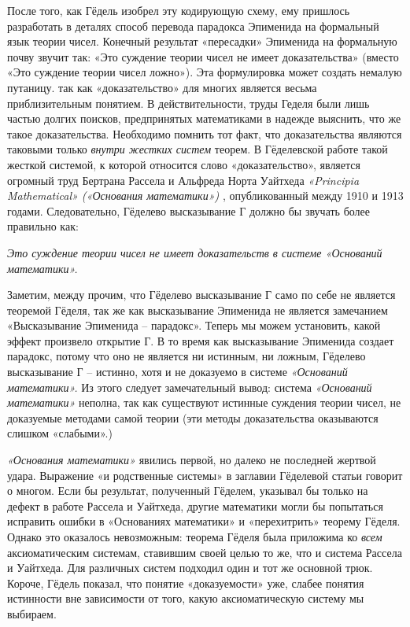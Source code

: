 \documentclass[../main.tex]{subfiles}
\begin{document}
После того, как Гёдель изобрел эту кодирующую схему, ему пришлось разработать в деталях способ перевода парадокса Эпименида на формальный язык теории чисел. Конечный результат «пересадки» Эпименида на формальную почву звучит так: «Это суждение теории чисел не имеет доказательства» (вместо «Это суждение теории чисел ложно»). Эта формулировка может создать немалую путаницу. так как «доказательство» для многих является весьма приблизительным понятием. В действительности, труды Геделя были лишь частью долгих поисков, предпринятых математиками в надежде выяснить, что же такое доказательства. Необходимо помнить тот факт, что доказательства являются таковыми только \emph{внутри жестких систем} теорем. В Гёделевской работе такой жесткой системой, к которой относится слово «доказательство», является огромный труд Бертрана Рассела и Альфреда Норта Уайтхеда \emph{«Principia Mathematical» («Основания математики»)} , опубликованный между 1910 и 1913 годами. Следовательно, Гёделево высказывание Г должно бы звучать более правильно как:

\emph{Это суждение теории чисел не имеет доказательств в системе «Оснований математики».}

Заметим, между прочим, что Гёделево высказывание Г само по себе не является теоремой Гёделя, так же как высказывание Эпименида не является замечанием «Высказывание Эпименида \--- парадокс». Теперь мы можем установить, какой эффект произвело открытие Г. В то время как высказывание Эпименида создает парадокс, потому что оно не является ни истинным, ни ложным, Гёделево высказывание Г \--- истинно, хотя и не доказуемо в системе \emph{«Оснований математики».} Из этого следует замечательный вывод: система \emph{«Оснований математики»} неполна, так как существуют истинные суждения теории чисел, не доказуемые методами самой теории (эти методы доказательства оказываются слишком «слабыми».)

\emph{«Основания математики»} явились первой, но далеко не последней жертвой удара. Выражение «и родственные системы» в заглавии Гёделевой статьи говорит о многом. Если бы результат, полученный Гёделем, указывал бы только на дефект в работе Рассела и Уайтхеда, другие математики могли бы попытаться исправить ошибки в «Основаниях математики» и «перехитрить» теорему Гёделя. Однако это оказалось невозможным: теорема Гёделя была приложима ко \emph{всем} аксиоматическим системам, ставившим своей целью то же, что и система Рассела и Уайтхеда. Для различных систем подходил один и тот же основной трюк. Короче, Гёдель показал, что понятие «доказуемости» уже, слабее понятия истинности вне зависимости от того, какую аксиоматическую систему мы выбираем.
\end{document}
